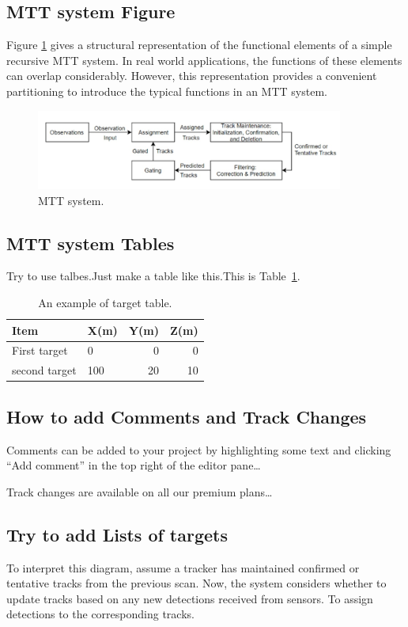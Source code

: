 \documentclass{article}
\begin{document}
\subsection{MTT system Figure}
Figure \ref{fig:MTT}  gives a structural representation of the functional elements of a simple recursive MTT system. In real world applications, the functions of these elements can overlap considerably. However, this representation provides a convenient partitioning to introduce the typical functions in an MTT system.
\begin{figure}
\centering
\includegraphics[width=0.9\textwidth]{MTT-figure01.jpg}
\caption{\label{fig:MTT}MTT system.}
\end{figure}

\subsection{MTT system Tables}

Try to use talbes.Just make a table like this.This is Table~\ref{tab:widgets}.

\begin{table}
\centering
\begin{tabular}{l|l|r|r}
Item & X(m) & Y(m) & Z(m) \\\hline
First target & 0 & 0 & 0  \\
second target & 100 & 20 & 10 
\end{tabular}
\caption{\label{tab:widgets}An example of target table.}
\end{table}

\subsection{How to add Comments and Track Changes}

Comments can be added to your project by highlighting some text and clicking ``Add comment'' in the top right of the editor pane\dots

Track changes are available on all our premium plans\dots

\subsection{Try to add Lists of targets}
To interpret this diagram, assume a tracker has maintained confirmed or tentative tracks from the previous scan. Now, the system considers whether to update tracks based on any new detections received from sensors. To assign detections to the corresponding tracks.
\end{document}
